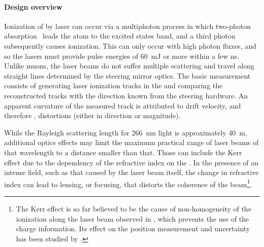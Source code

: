 \paragraph{Design overview}
Ionization of  by laser can occur via a multiphoton process in which two-photon absorption~\cite{Badhrees:2010zz} leads the atom to the excited states band, and a third photon subsequently causes ionization. This can only occur with high photon fluxes, and so the lasers must provide pulse energies of \SI{60}{\milli\joule} or more within a few ns. Unlike muons, the laser beams do not suffer multiple scattering and travel along straight lines determined by the steering mirror optics. 
The basic measurement consists of %
generating laser ionization tracks in the  and comparing the reconstructed tracks with the direction known from the steering hardware. 
An apparent curvature of the measured track is attributed to drift velocity, and therefore \efield, distortions (either in direction or magnitude).



While the Rayleigh scattering length for \SI{266}{\nano\m}  light is approximately \SI{40}{\m}, additional optics effects may limit the maximum practical range of laser beams of that wavelength to a distance smaller than that. Those can include the Kerr effect  due to the dependency of the refractive index on the \efield. In the presence of an intense field, such as that caused by the laser beam itself, the change in refractive index can lead to lensing, or focusing, that distorts the coherence of the beam\footnote{The Kerr effect is so far believed to be the cause of non-homogeneity of the ionization along the laser beam observed in , which prevents the use of the charge information. Its effect on the position measurement and \efield uncertainty has been studied by .}. 

